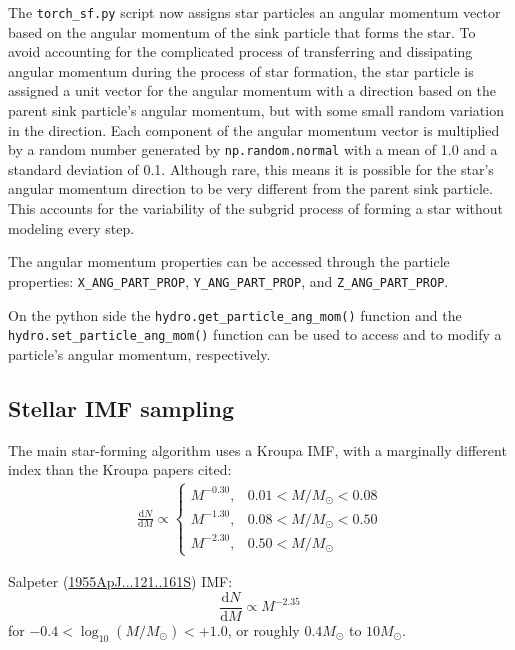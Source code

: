 \documentclass[10pt]{article}
\newcommand*{\Msun}{M_\odot}
\begin{document}
The \texttt{torch\_sf.py} script now assigns star particles an angular momentum vector based on the angular momentum of the sink particle that forms the star. To avoid accounting for the complicated process of transferring and dissipating angular momentum during the process of star formation, the star particle is assigned a unit vector for the angular momentum with a direction based on the parent sink particle's angular momentum, but with some small random variation in the direction. Each component of the angular momentum vector is multiplied by a random number generated by \texttt{np.random.normal} with a mean of 1.0 and a standard deviation of 0.1. Although rare, this means it is possible for the star's angular momentum direction to be very different from the parent sink particle. This accounts for the variability of the subgrid process of forming a star without modeling every step.

The angular momentum properties can be accessed through the particle properties: \texttt{X\_ANG\_PART\_PROP}, \texttt{Y\_ANG\_PART\_PROP}, and \texttt{Z\_ANG\_PART\_PROP}.

On the python side the \texttt{hydro.get\_particle\_ang\_mom()} function and the  \texttt{hydro.set\_particle\_ang\_mom()} function can be used to access and to modify a particle's angular momentum, respectively.



\subsection{Stellar IMF sampling}


The main star-forming algorithm uses a Kroupa IMF, with a marginally different
index than the Kroupa papers cited:
\begin{align*}
    \frac{\mathrm{d} N}{\mathrm{d} M} \propto
    \begin{cases}
        M^{-0.30}, & 0.01 < M/\Msun < 0.08 \\
        M^{-1.30}, & 0.08 < M/\Msun < 0.50 \\
        M^{-2.30}, & 0.50 < M/\Msun
    \end{cases}
\end{align*}


Salpeter (\href{https://ui.adsabs.harvard.edu/abs/1955ApJ...121..161S}{1955ApJ...121..161S}) IMF:
\[
    \frac{\mathrm{d} N}{\mathrm{d} M} \propto M^{-2.35}
\]
for $-0.4 < \log_{10} \left(M/\Msun\right) < +1.0$, or roughly $0.4 \Msun$ to
$10 \Msun$.
\end{document}
